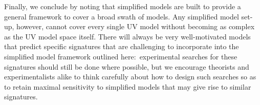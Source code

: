 Finally, we conclude by noting that simplified models are built to provide a general framework to cover a broad swath of models. Any simplified model set-up, however, cannot cover every single UV model without becoming as complex as the UV model space itself. There will always be very well-motivated models that predict specific signatures that are challenging to incorporate into the simplified model framework outlined here:~experimental searches for these signatures should still be done where possible, but we encourage theorists and experimentalists alike to think carefully about how to design such searches so as to retain maximal sensitivity to simplified models that may give rise to similar signatures.
